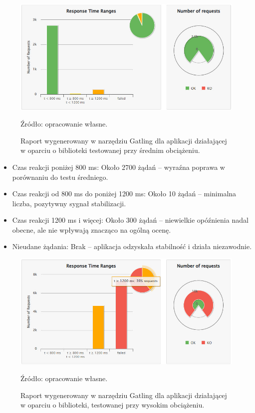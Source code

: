 \documentclass[runningheads,12pt]{llncs}
\begin{document}
\begin{figure}
    \centering
    \includegraphics[width=0.8\linewidth]{images/library-gatling-middle-graph.jpg}
    \caption{Raport wygenerowany w narzędziu Gatling dla aplikacji działającej w oparciu o biblioteki testowanej przy średnim obciążeniu.}
    \vspace{0.5em}
    {\small Źródło: opracowanie własne.}
    \label{fig:middle}
\end{figure}

\begin{itemize}
    \item Czas reakcji poniżej 800 ms: Około 2700 żądań – wyraźna poprawa w porównaniu do testu średniego.
    \item Czas reakcji od 800 ms do poniżej 1200 ms: Około 10 żądań – minimalna liczba, pozytywny sygnał stabilizacji.
    \item Czas reakcji 1200 ms i więcej: Około 300 żądań – niewielkie opóźnienia nadal obecne, ale nie wpływają znacząco na ogólną ocenę.
    \item Nieudane żądania: Brak – aplikacja odzyskała stabilność i działa niezawodnie.
\end{itemize}

\newpage

\begin{figure}
    \centering
    \includegraphics[width=0.8\linewidth]{images/library-gatling-high-graph.jpg}
    \caption{Raport wygenerowany w narzędziu Gatling dla aplikacji działającej w oparciu o biblioteki, testowanej przy wysokim obciążeniu.}
    \vspace{0.5em}
    {\small Źródło: opracowanie własne.}
    \label{fig:high}
\end{figure}
\end{document}
